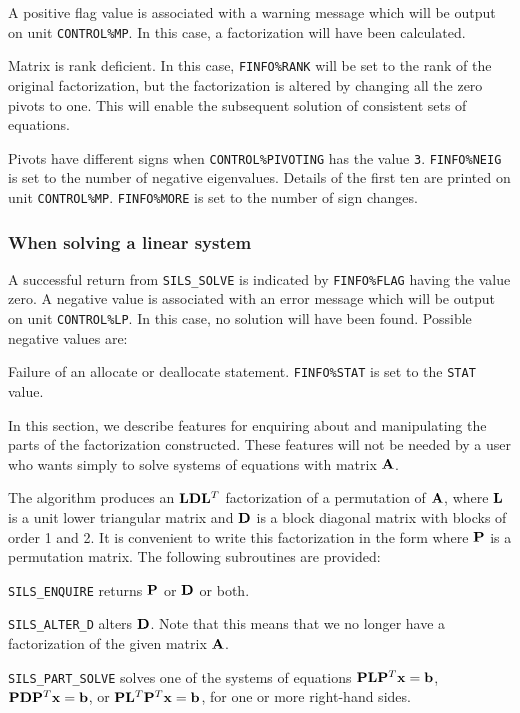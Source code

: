 \documentclass{galahad}
\newcommand{\packagename}{SILS}
\begin{document}
A positive flag value is associated with a warning message
 which will  be output on unit {\tt CONTROL\%MP}. In this case, a
 factorization will have been calculated.

\begin{description}
 Matrix is rank deficient.  In this case, {\tt FINFO\%RANK} will be
set to the rank of the original factorization, but the factorization is
altered by changing all the zero pivots to one. This will enable the
subsequent solution of consistent sets of equations.

 Pivots have different signs when {\tt CONTROL\%PIVOTING} has the value
 {\tt 3}.
 {\tt FINFO\%NEIG} is set to the number of negative eigenvalues.
 Details of the first ten are printed on unit {\tt CONTROL\%MP}.
       {\tt FINFO\%MORE} is set to the number of sign changes.

\end{description}


\subsubsection{When solving a linear system}\label{errorsolve}
A successful return from {\tt \packagename\_SOLVE} is indicated by
 {\tt FINFO\%FLAG} having the value zero.  A negative value is
 associated with an error message which will  be output on unit
 {\tt CONTROL\%LP}. In this case, no solution will have been
 found.  Possible negative values are:


\begin{description}
 Failure of an allocate or deallocate statement. {\tt FINFO\%STAT}
 is set to the {\tt STAT} value.
\end{description}


\galfeatures
\noindent In this section, we describe features for enquiring about and
manipulating the parts of the factorization constructed. These features
will not be needed by a user who wants simply to solve systems of
equations with matrix ${\mathbf{A}}$.

The algorithm produces an ${\mathbf{L}} {\mathbf{D}} {\mathbf{L}}^T$ factorization
of a permutation of ${\mathbf{A}}$, where ${\mathbf{L}}$ is a unit lower triangular
matrix and ${\mathbf{D}}$ is a block diagonal matrix with blocks of order
1 and 2. It is convenient to write this factorization in the form
where ${\mathbf{P}}$ is a permutation matrix. The following subroutines
are provided:
\begin{description}
\ittf{} {\tt \packagename\_ENQUIRE} returns ${\mathbf{P}}$ or ${\mathbf{D}}$ or both.

\ittf{} {\tt \packagename\_ALTER\_D} alters ${\mathbf{D}}$. Note that this means that
we no longer have a factorization of the given matrix ${\mathbf{A}}$.

\ittf{} {\tt \packagename\_PART\_SOLVE} solves one of the systems of equations
${\mathbf{P}} {\mathbf{L}} {\mathbf{P}}^T {\mathbf{x}} =  {\mathbf{b}}$,
${\mathbf{P}} {\mathbf{D}} {\mathbf{P}}^T {\mathbf{x}} =  {\mathbf{b}}$, or
${\mathbf{P}} {\mathbf{L}}^T {\mathbf{P}}^T {\mathbf{x}} =  {\mathbf{b}}$,
for one or more right-hand sides.

\end{description}
\end{document}
